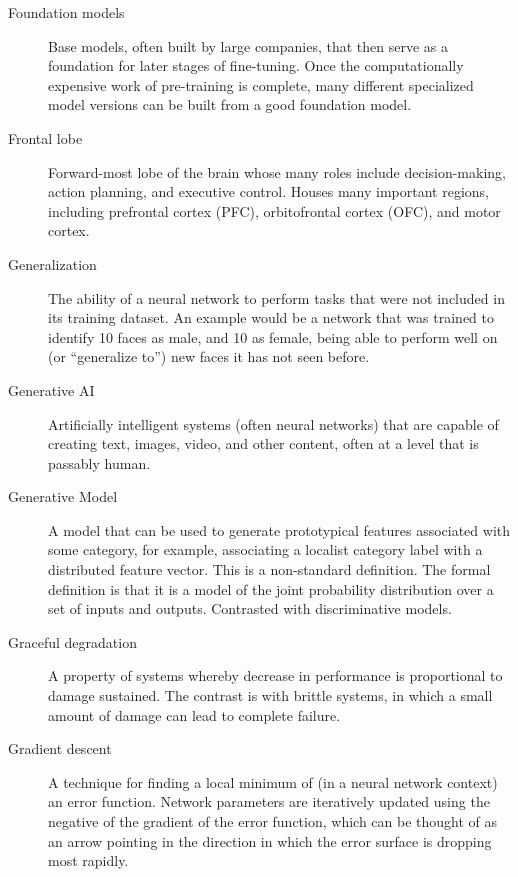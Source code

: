 \begin{description}
\item[Foundation models] Base models, often built by large companies, that then serve as a foundation for later stages of fine-tuning. Once the computationally expensive work of pre-training is complete, many different specialized model versions can be built from a good foundation model.

\item[Frontal lobe] Forward-most lobe of the brain whose many roles include decision-making, action planning, and executive control. Houses many important regions, including prefrontal cortex (PFC), orbitofrontal cortex (OFC), and motor cortex. 

\item[Generalization] The ability of a neural network to perform tasks that were not included in its training dataset. An example would be a network that was trained to identify 10 faces as male, and 10 as female, being able to perform well on (or ``generalize to'') new faces it has not seen before.

\item[Generative AI] Artificially intelligent systems (often neural networks) that are capable of creating text, images, video, and other content, often at a level that is passably human.

\item[Generative Model] A model that can be used to generate prototypical features associated with some category, for example, associating a localist category label with a distributed feature vector. This is a non-standard definition. The formal definition is that it is a model of the joint probability distribution over a set of inputs and outputs. Contrasted with discriminative models. 

\item[Graceful degradation] A property of systems whereby decrease in performance is proportional to damage sustained. The contrast is with brittle systems, in which a small amount of damage can lead to complete failure.

\item[Gradient descent] A technique for finding a local minimum of (in a neural network context) an error function. Network parameters are iteratively updated using the negative of the gradient of the error function, which can be thought of as an arrow pointing in the direction in which the error surface is dropping most rapidly.



\end{description}
